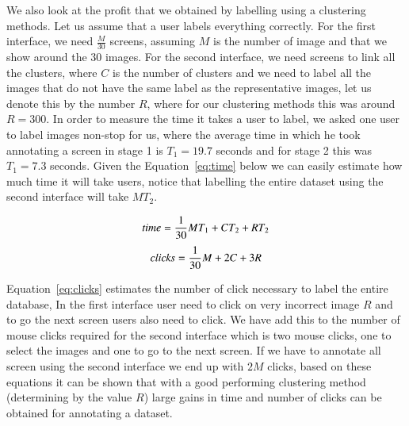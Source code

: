 We also look at the profit that we obtained by labelling using a clustering methods. Let us assume
that a user labels everything correctly. For the first interface, we need $\frac{M}{30}$ screens,
assuming $M$ is the number of image and that we show around the 30 images. For the second 
interface, we need screens to link all the clusters, where $C$ is the number of clusters and we need
to label all the images that do not have the same label as the representative images, let us
denote this by the number $R$, where for our clustering methods this was around $R = 300$. 
In order to measure the time it takes a user to label,
we asked one user to label images non-stop for us, where the average time in which he 
took annotating a screen in stage 1 is $T_{1}=19.7$ seconds and for stage 2 this was 
$T_{1}=7.3$ seconds. Given the Equation~\ref{eq:time} below we can easily estimate how much time 
it will take users, notice that labelling the entire dataset using the second interface 
will take $MT_{2}$. 

\begin{equation}
 \textit{time} = \frac{1}{30}MT_{1} + CT_{2} + RT_{2} \label{eq:time} \\
\end{equation}
\begin{equation}
 \textit{clicks} = \frac{1}{30}M + 2C + 3R \label{eq:clicks} \\
\end{equation} 

Equation~\ref{eq:clicks} estimates the number of click necessary to label the entire database,
In the first interface user need to click on very incorrect image $R$ and to go the next
screen users also need to click. We have add this to the number of mouse clicks required
for the second interface which is two mouse clicks, one to select the images and one to 
go to the next screen. If we have to annotate all screen using the second interface we
end up with $2M$ clicks, based on these equations it can be shown that with a good
performing clustering method (determining by the value $R$) large gains in time and number
of clicks can be obtained for annotating a dataset. \\

